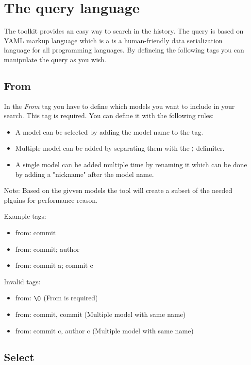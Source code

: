 \section{The query language}

The toolkit provides an easy way to search in the history.
The query is based on YAML\cite{yaml} markup language which is a is a human-friendly data serialization language for all programming languages. 
By defineing the following tags you can manipulate the query as you wish.


\subsection{From}

In the \textit{From} tag you have to define which models you want to include in your search.
This tag is required.
You can define it with the following rules:

\begin{itemize}
	\item A model can be selected by adding the model name to the tag.
	\item Multiple model can be added by separating them with the \textbf{;} delimiter.
	\item A single model can be added multiple time by renaming it which can be done by adding a "nickname" after the model name.
\end{itemize}

Note: Based on the givven models the tool will create a subset of the needed plguins for performance reason.

Example tags:
\begin{itemize}
	\item from: commit
	\item from: commit; author
	\item from: commit a; commit c
\end{itemize}

Invalid tags:
\begin{itemize}
	\item from: $\O$ (From is required)
	\item from: commit, commit (Multiple model with same name)
	\item from: commit c, author c (Multiple model with same name)
\end{itemize}

\subsection{Select}

